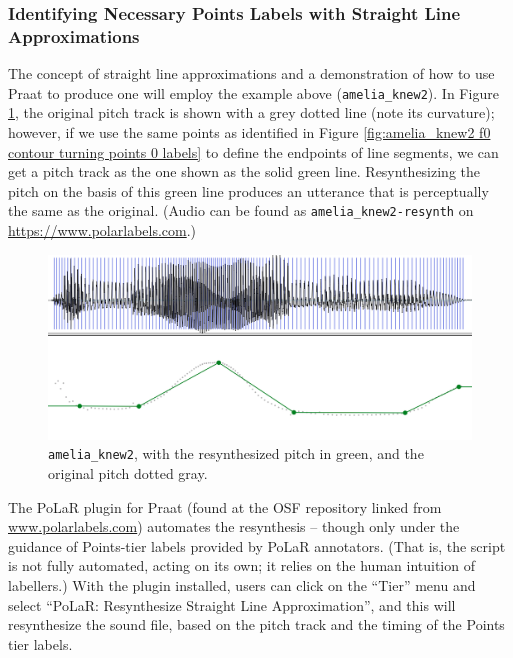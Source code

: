 \documentclass[11pt, twoside]{memoir}
\begin{document}
\subsubsection{Identifying Necessary Points Labels with Straight Line Approximations}\label{sec:identifying-necessary-points-labels-with-straight-line-approximations}
The concept of straight line approximations and a demonstration of how to use Praat to produce one will employ the example above (\texttt{amelia\_knew2}). In Figure \ref{fig:amelia_knew2 resynth}, the original pitch track is shown with a grey dotted line (note its curvature); however, if we use the same points as identified in Figure \ref{fig:amelia_knew2 f0 contour turning points 0 labels} to define the endpoints of line segments, we can get a pitch track as the one shown as the solid green line. Resynthesizing the pitch on the basis of this green line produces an utterance that is perceptually the same as the original. (Audio can be found as \texttt{amelia\_knew2-resynth} on \url{https://www.polarlabels.com}.)
\begin{figure}[H]
\centering
\includegraphics[width=.875\linewidth]{Points-amelia_knew2-resynth.png}
\caption{\texttt{amelia\_knew2}, with the resynthesized pitch in green, and the original pitch dotted gray.
\label{fig:amelia_knew2 resynth}
}
\end{figure}
The PoLaR plugin for Praat (found at the OSF repository linked from \href{https://www.polarlabels.com}{www.polarlabels.com}) automates the resynthesis – though only under the guidance of Points-tier labels provided by PoLaR annotators. (That is, the script is not fully automated, acting on its own; it relies on the human intuition of labellers.) With the plugin installed, users can click on the “Tier” menu and select “PoLaR: Resynthesize Straight Line Approximation”, and this will resynthesize the sound file, based on the pitch track and the timing of the Points tier labels.
\end{document}
